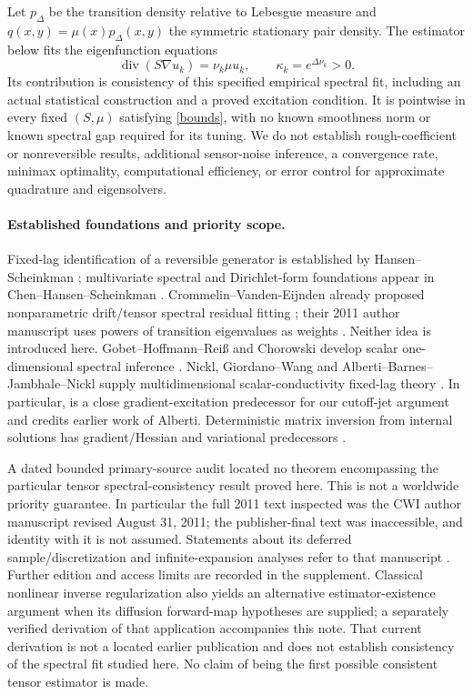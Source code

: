 \documentclass[11pt]{article}
\theoremstyle{remark}\newtheorem{remark}[theorem]{Remark}
\newcommand{\Div}{\operatorname{div}}
\begin{document}
Let $p_\Delta$ be the transition density relative to Lebesgue measure and
$q(x,y)=\mu(x)p_\Delta(x,y)$ the symmetric stationary pair density.
The estimator below fits the eigenfunction equations
\begin{equation}\label{pde}
 \Div(S\nabla u_k)=\nu_k\mu u_k,
 \qquad \kappa_k=e^{\Delta\nu_k}>0.
\end{equation}
Its contribution is consistency of this specified empirical spectral fit,
including an actual statistical construction and a proved excitation
condition. It is pointwise in every fixed $(S,\mu)$ satisfying
\eqref{bounds}, with no known smoothness norm or known spectral gap required
for its tuning. We do not establish rough-coefficient or nonreversible
results, additional sensor-noise inference, a convergence rate, minimax
optimality, computational efficiency, or error control for approximate
quadrature and eigensolvers.

\paragraph{Established foundations and priority scope.}
Fixed-lag identification of a reversible generator is established by
Hansen--Scheinkman \cite[Proposition~5.5]{hs}; multivariate spectral and
Dirichlet-form foundations appear in Chen--Hansen--Scheinkman \cite{chs}.
Crommelin--Vanden-Eijnden already proposed nonparametric drift/tensor spectral
residual fitting \cite{cv2006}; their 2011 author manuscript uses powers of
transition eigenvalues as weights \cite[Eq.~(4.7)]{cv2011}. Neither idea is
introduced here. Gobet--Hoffmann--Rei\ss{} and Chorowski develop scalar
one-dimensional spectral inference \cite{ghr,chorowski}. Nickl,
Giordano--Wang and Alberti--Barnes--Jambhale--Nickl supply multidimensional
scalar-conductivity fixed-lag theory \cite{nickl,gw,abjn}. In particular,
\cite[Lemma~3.8]{abjn} is a close gradient-excitation predecessor for our
cutoff-jet argument and credits earlier work of Alberti. Deterministic
matrix inversion from internal solutions has gradient/Hessian and
variational predecessors \cite{bal,kohn}.

A dated bounded primary-source audit located no theorem encompassing the
particular tensor spectral-consistency result proved here. This is not a
worldwide priority guarantee. In particular the full 2011 text inspected was
the CWI author manuscript revised August 31, 2011; the publisher-final text
was inaccessible, and identity with it is not assumed. Statements about its
deferred sample/discretization and infinite-expansion analyses refer to that
manuscript \cite[Sections~3.2 and~4.2]{cv2011}. Further edition and access
limits are recorded in the supplement. Classical nonlinear inverse
regularization \cite{lenzen} also yields an alternative estimator-existence
argument when its diffusion forward-map hypotheses are supplied; a separately
verified derivation of that application accompanies this note. That current
derivation is not a located earlier publication and does not establish
consistency of the spectral fit studied here. No claim of being the first
possible consistent tensor estimator is made.
\end{document}
